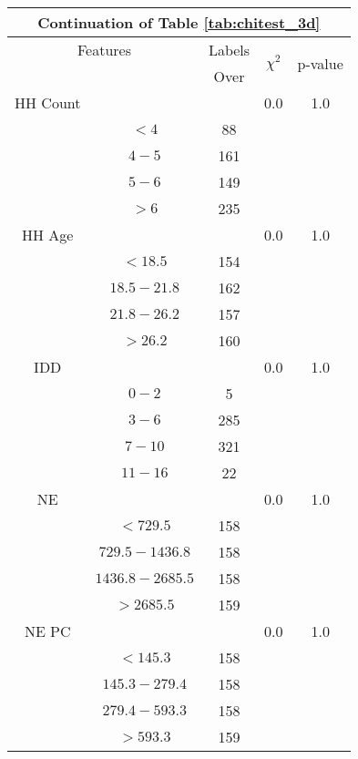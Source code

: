 \begin{table}
\centering
\label{tab:chitest_3d_cont}
\begin{tabular}{c c | c| c | c}
\hline
\multicolumn{5}{c}{Continuation of Table \ref{tab:chitest_3d}}\\ 
\hline
\multicolumn{2}{c|}{Features}& \multicolumn{1}{c|}{Labels}& \multirow{2}{*}{$\chi^2$} & \multirow{2}{*}{p-value}\\ 
& & Over & & \\ 
\hline
HH Count &  & & 0.0 & 1.0 \\ 
& $< 4$ & 88& & \\ 
& $4-5$ & 161& & \\ 
& $5-6$ & 149& & \\ 
& $> 6$ & 235& & \\ 
\hline 
HH Age &  & & 0.0 & 1.0 \\ 
& $< 18.5$ & 154& & \\ 
& $18.5-21.8$ & 162& & \\ 
& $21.8-26.2$ & 157& & \\ 
& $> 26.2$ & 160& & \\ 
\hline 
IDD &  & & 0.0 & 1.0 \\ 
& $0-2$ & 5& & \\ 
& $3-6$ & 285& & \\ 
& $7-10$ & 321& & \\ 
& $11-16$ & 22& & \\ 
\hline 
NE &  & & 0.0 & 1.0 \\ 
& $< 729.5$ & 158& & \\ 
& $729.5-1436.8$ & 158& & \\ 
& $1436.8-2685.5$ & 158& & \\ 
& $> 2685.5$ & 159& & \\ 
\hline 
NE PC &  & & 0.0 & 1.0 \\ 
& $< 145.3$ & 158& & \\ 
& $145.3-279.4$ & 158& & \\ 
& $279.4-593.3$ & 158& & \\ 
& $> 593.3$ & 159& & \\ 
\hline 
\end{tabular}
\end{table}

